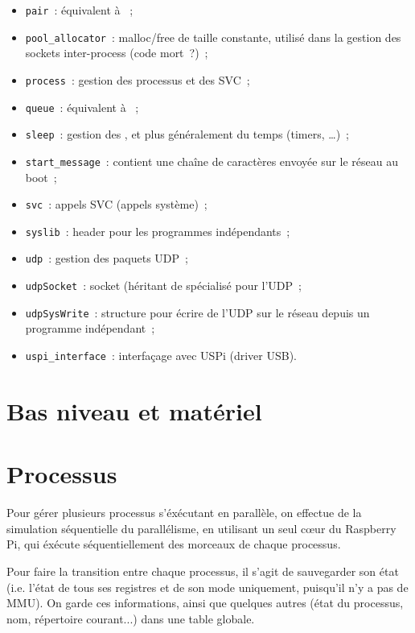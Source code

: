 \documentclass[11pt,a4paper]{article}
\begin{document}
\begin{itemize}
	\item \texttt{pair}~: équivalent à ~;
	\item \texttt{pool\_allocator}~: malloc/free de taille constante, utilisé
		dans la gestion des sockets inter-process (code mort~?)~;
	\item \texttt{process}~: gestion des processus et des SVC~;
	\item \texttt{queue}~: équivalent à ~;
	\item \texttt{sleep}~: gestion des , et plus généralement
		du temps (timers, \ldots)~;
	\item \texttt{start\_message}~: contient une chaîne de caractères envoyée
		sur le réseau au boot~;
	\item \texttt{svc}~: appels SVC (appels système)~;
	\item \texttt{syslib}~: header pour les programmes indépendants~;
	\item \texttt{udp}~: gestion des paquets UDP~;
	\item \texttt{udpSocket}~: socket (héritant de 
		spécialisé pour l'UDP~;
	\item \texttt{udpSysWrite}~: structure pour écrire de l'UDP sur le
		réseau depuis un programme indépendant~;
	\item \texttt{uspi\_interface}~: interfaçage avec USPi (driver USB).
\end{itemize}

\section{Bas niveau et matériel}

\section{Processus}

Pour gérer plusieurs processus s'éxécutant en parallèle, on effectue
de la simulation séquentielle du parallélisme, en utilisant un seul
cœur du Raspberry Pi, qui éxécute séquentiellement des morceaux de
chaque processus.

Pour faire la transition entre chaque processus, il s'agit de
sauvegarder son état (i.e. l'état de tous ses registres et de son mode
uniquement, puisqu'il n'y a pas de MMU). On garde ces informations,
ainsi que quelques autres (état du processus, nom, répertoire
courant...) dans une table globale.
\end{document}
